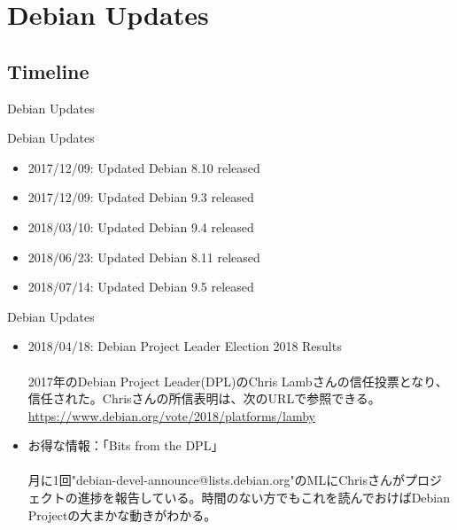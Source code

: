 \documentclass[cjk,dvipdfmx,10pt,compress,%
hyperref={bookmarks=true,bookmarksnumbered=true,bookmarksopen=false,%
colorlinks=false,%
pdftitle={第 132 回 関西 Debian 勉強会},%
pdfauthor={かわだ},%
pdfsubject={資料},%
}]{beamer}
\begin{document}
\section{Debian Updates}
\subsection{Timeline}
\begin{frame}
  \begin{center}\Huge{Debian Updates}\end{center}
\end{frame}

\begin{frame}{Debian Updates}%
\begin{itemize}
\item 2017/12/09:  Updated Debian 8.10 released\\
\item 2017/12/09:  Updated Debian 9.3  released\\
\item 2018/03/10:  Updated Debian 9.4  released\\
\item 2018/06/23:  Updated Debian 8.11 released\\
\item 2018/07/14:  Updated Debian 9.5  released\\
\end{itemize}
\end{frame}

\begin{frame}{Debian Updates}%
\begin{itemize}
\item 2018/04/18: Debian Project Leader Election 2018 Results\\
\ \\
  \small{2017年のDebian Project Leader(DPL)のChris Lambさんの信任投票となり、信任された。Chrisさんの所信表明は、次のURLで参照できる。\url{https://www.debian.org/vote/2018/platforms/lamby}}
\item お得な情報：「Bits from the DPL」\\
\ \\
  \small{月に1回"debian-devel-announce@lists.debian.org"のMLにChrisさんがプロジェクトの進捗を報告している。時間のない方でもこれを読んでおけばDebian Projectの大まかな動きがわかる。}
\end{itemize}
\end{frame}
\end{document}

